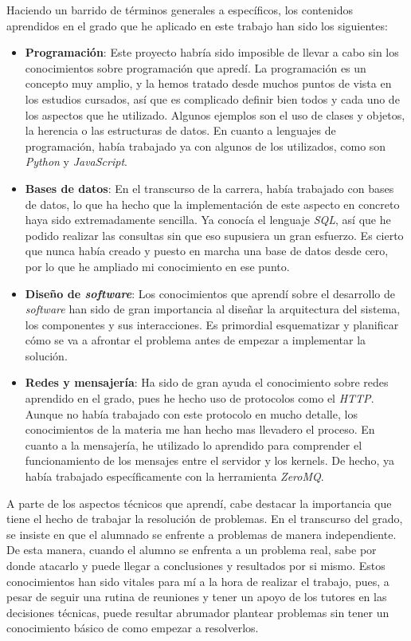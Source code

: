 \documentclass[11pt,spanish,listoffigures]{tfgetsinf}
\begin{document}
Haciendo un barrido de términos generales a específicos, los contenidos aprendidos en el grado que he aplicado en este trabajo han sido los siguientes: 

\begin{itemize}

\item \textbf{Programación}: Este proyecto habría sido imposible de llevar a cabo sin los conocimientos sobre programación que apredí. La programación es un concepto muy amplio, y la hemos tratado desde muchos puntos de vista en los estudios cursados, así que es complicado definir bien todos y cada uno de los aspectos que he utilizado. Algunos ejemplos son el uso de clases y objetos, la herencia o las estructuras de datos. En cuanto a lenguajes de programación, había trabajado ya con algunos de los utilizados, como son \textit{Python} y \textit{JavaScript}.

\item \textbf{Bases de datos}: En el transcurso de la carrera, había trabajado con bases de datos, lo que ha hecho que la implementación de este aspecto en concreto haya sido extremadamente sencilla. Ya conocía el lenguaje \textit{SQL}, así que he podido realizar las consultas sin que eso supusiera un gran esfuerzo. Es cierto que nunca había creado y puesto en marcha una base de datos desde cero, por lo que he ampliado mi conocimiento en ese punto.

\item \textbf{Diseño de \textit{software}}: Los conocimientos que aprendí sobre el desarrollo de \textit{software} han sido de gran importancia al diseñar la arquitectura del sistema, los componentes y sus interacciones. Es primordial esquematizar y planificar cómo se va a afrontar el problema antes de empezar a implementar la solución.

\item \textbf{Redes y mensajería}: Ha sido de gran ayuda el conocimiento sobre redes aprendido en el grado, pues he hecho uso de protocolos como el \textit{HTTP}. Aunque no había trabajado con este protocolo en mucho detalle, los conocimientos de la materia me han hecho mas llevadero el proceso. En cuanto a la mensajería, he utilizado lo aprendido para comprender el funcionamiento de los mensajes entre el servidor y los kernels. De hecho, ya había trabajado específicamente con la herramienta \textit{ZeroMQ}.

\end{itemize}

A parte de los aspectos técnicos que aprendí, cabe destacar la importancia que tiene el hecho de trabajar la resolución de problemas. En el transcurso del grado, se insiste en que el alumnado se enfrente a problemas de manera independiente. De esta manera, cuando el alumno se enfrenta a un problema real, sabe por donde atacarlo y puede llegar a conclusiones y resultados por si mismo. Estos conocimientos han sido vitales para mí a la hora de realizar el trabajo, pues, a pesar de seguir una rutina de reuniones y tener un apoyo de los tutores en las decisiones técnicas, puede resultar abrumador plantear problemas sin tener un conocimiento básico de como empezar a resolverlos.
\end{document}
